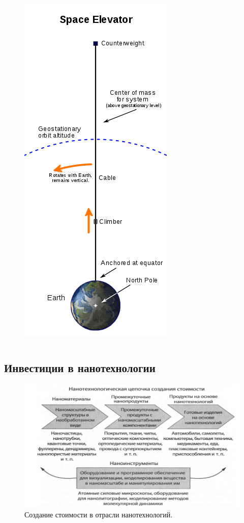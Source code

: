\documentclass[_Venture_p3.tex]{subfiles}
\begin{document}
\begin{frame}
\begin{figure}
	\centering
	\begin{columns}
		{\centering \includegraphics[scale=.50]{img/space_elevator}}
	\end{columns}
\end{figure}
\end{frame}
\subsection{Инвестиции в нанотехнологии}
\begin{frame}
\begin{figure}
	\centering
	\includegraphics[scale=.45]{img/investment_in_nanotechnology}
	\caption{Создание стоимости в отрасли нанотехнологий.}
\end{figure}
\end{frame}
\end{document}
